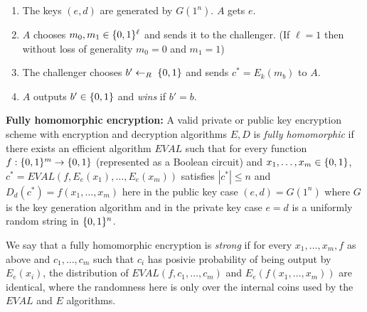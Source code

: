 \documentclass{article}
\begin{document}
\begin{enumerate}[noitemsep,topsep=\mdcompacttopsep]%

\item{}The keys $(e,d)$ are generated by $G(1^n)$. $A$ gets $e$.%

\item{}$A$ chooses $m_0,m_1 \in \{0,1\}^\ell$ and sends it to the challenger. (If $\ell=1$ then without loss of generality $m_0=0$ and $m_1=1$)%

\item{}The challenger chooses $b'\leftarrow_R\;\{0,1\}$ and sends $c^* = E_k(m_b)$ to $A$.%

\item{}$A$ outputs $b'\in\{0,1\}$ and \emph{wins} if $b'=b$.%
\end{enumerate}%

\noindent{}\textbf{Fully homomorphic encryption:} A valid  private or public key encryption scheme with encryption and decryption algorithms $E,D$ is  \emph{fully homomorphic} if there exists
an efficient algorithm $EVAL$ such that for every function $f:\{0,1\}^m\rightarrow\{0,1\}$ (represented as a Boolean circuit) and $x_1,\ldots,x_m \in \{0,1\}$,
$c^* = EVAL(f,E_e(x_1),\ldots,E_e(x_m))$ satisfies $|c^*|\leq n$ and $D_d(c^*)=f(x_1,\ldots,x_m)$ here in the public key case $(e,d)=G(1^n)$ where $G$ is the key generation algorithm
and in the private key case $e=d$ is a uniformly random string in $\{0,1\}^n$.%

We say that a fully homomorphic encryption is \emph{strong} if for every $x_1,\ldots,x_m,f$ as above and $c_1,\ldots,c_m$ such that $c_i$ has posivie probability of being output by $E_e(x_i)$, the distribution of $EVAL(f,c_1,\ldots,c_m)$ and $E_e(f(x_1,\ldots,x_m))$ are identical, where the randomness here is only over the internal coins used by the $EVAL$ and $E$ algorithms.%
\end{document}
